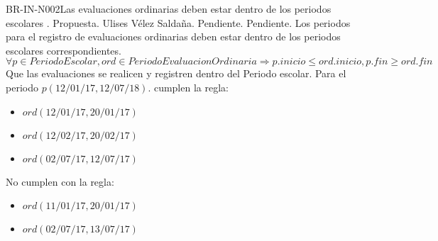 \begin{BusinessRule}{BR-IN-N002}{Las evaluaciones ordinarias deben estar dentro de los periodos escolares}
	{\bcCondition}    %
	{\btEnabler}     %
	{\blControlling}    %
	.
	\BRItem[Estado] Propuesta.
	 Ulises Vélez Saldaña.
	 Pendiente.
	 Pendiente.
	\BRItem[Descripción] Los periodos para el registro de evaluaciones ordinarias deben estar dentro de los periodos escolares correspondientes.
	\BRItem[Sentencia] \[
		\forall p\in PeriodoEscolar, ord \in PeriodoEvaluacionOrdinaria \Rightarrow p.inicio \leq ord.inicio, p.fin \geq ord.fin
	\]
	\BRItem[Motivación] Que las evaluaciones se realicen y registren dentro del Periodo escolar.
	 Para el periodo $p(12/01/17, 12/07/18)$. cumplen la regla:
		\begin{itemize}
			\item $ord(12/01/17, 20/01/17)$
			\item $ord(12/02/17, 20/02/17)$
			\item $ord(02/07/17, 12/07/17)$
		\end{itemize}
	 No cumplen con la regla:
		\begin{itemize}
			\item $ord(11/01/17, 20/01/17)$
			\item $ord(02/07/17, 13/07/17)$
		\end{itemize}
\end{BusinessRule}


